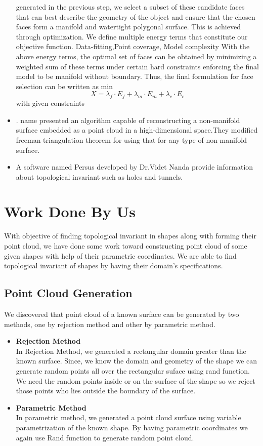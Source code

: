 \documentclass[12pt]{article}
\begin{document}
\begin{itemize}
generated in the previous step, we select a subset of these
candidate faces that can best describe the geometry of the
object and ensure that the chosen faces form a manifold and
watertight polygonal surface. This is achieved through optimization.
We define multiple energy terms that constitute
our objective function.
Data-fitting,Point coverage, Model complexity
With the above energy terms, the optimal set of faces can
be obtained by minimizing a weighted sum of these terms
under certain hard constraints enforcing the final model to
be manifold without boundary.  Thus, the final
formulation for face selection can be written as
min
\[
X = \lambda _{f}\cdot E_{f} + \lambda _{m}\cdot E_{m} + \lambda _{c}\cdot E_{c}
\] with given constraints
\item . name presented an algorithm capable of reconstructing a non-manifold surface embedded as a point cloud in a high-dimensional space.They modified freeman triangulation theorem for using that for any type of non-manifold surface. 
\item A software named Persus developed by Dr.Videt Nanda provide information about topological invariant such as holes and tunnels.
\end{itemize}

\section{Work Done By Us}
With objective of finding topological invariant in shapes along with forming their point cloud, we have done some work toward constructing point cloud of some given shapes with help of their parametric coordinates. We are able to find topological invariant of shapes by having their domain’s specifications.\\

\subsection{ Point Cloud Generation}
We discovered that point cloud of a known surface can be generated by two methods, one by rejection method and other by parametric method. 
\begin{itemize}
\item{\textbf{Rejection Method}}\\
In Rejection Method, we generated a rectangular domain greater than the known surface. Since, we know the domain and geometry of the shape we can generate random points all over the rectangular suface using rand function. We need the random points inside or on the surface of the shape so we reject those points who lies outside the boundary of the surface.\\
\item{\textbf{Parametric Method}}\\
In parametric method, we generated a point cloud surface using variable parametrization of the known shape. By having parametric coordinates we again use Rand function to generate random point cloud.\\
\end{itemize}
\end{document}
